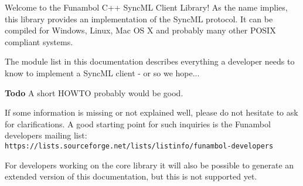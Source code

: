 Welcome to the Funambol C++ Sync\-ML Client Library! As the name implies, this library provides an implementation of the Sync\-ML protocol. It can be compiled for Windows, Linux, Mac OS X and probably many other POSIX compliant systems.

The module list in this documentation describes everything a developer needs to know to implement a Sync\-ML client - or so we hope...

\begin{Desc}
\item[{\bf Todo}]A short HOWTO probably would be good.\end{Desc}
If some information is missing or not explained well, please do not hesitate to ask for clarifications. A good starting point for such inquiries is the Funambol developers mailing list: {\tt https://lists.sourceforge.net/lists/listinfo/funambol-developers}

For developers working on the core library it will also be possible to generate an extended version of this documentation, but this is not supported yet. 